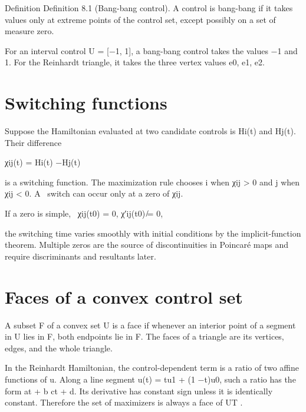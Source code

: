 \begin{statementbox}{Definition}
Definition 8.1 (Bang-bang control). A control is bang-bang if it takes values only at extreme points of the control set, except possibly on a set of measure zero.
\end{statementbox}

For an interval control U = [−1, 1], a bang-bang control takes the values −1 and 1. For the Reinhardt triangle, it takes the three vertex values e0, e1, e2.


\section{Switching functions}

Suppose the Hamiltonian evaluated at two candidate controls is Hi(t) and Hj(t). Their difference


\begin{displaytext}
χij(t) = Hi(t) −Hj(t)
\end{displaytext}

\begin{displaytext}
is a switching function. The maximization rule chooses i when χij > 0 and j when χij < 0. A \
switch can occur only at a zero of χij.
\end{displaytext}

\begin{displaytext}
If a zero is simple, \
χij(t0) = 0, χ′ij(t0) ̸= 0,
\end{displaytext}

the switching time varies smoothly with initial conditions by the implicit-function theorem. Multiple zeros are the source of discontinuities in Poincaré maps and require discriminants and resultants later.


\section{Faces of a convex control set}

A subset F of a convex set U is a face if whenever an interior point of a segment in U lies in F, both endpoints lie in F. The faces of a triangle are its vertices, edges, and the whole triangle.


In the Reinhardt Hamiltonian, the control-dependent term is a ratio of two affine functions of u. Along a line segment u(t) = tu1 + (1 −t)u0, such a ratio has the form at + b ct + d. Its derivative has constant sign unless it is identically constant. Therefore the set of maximizers is always a face of UT .


